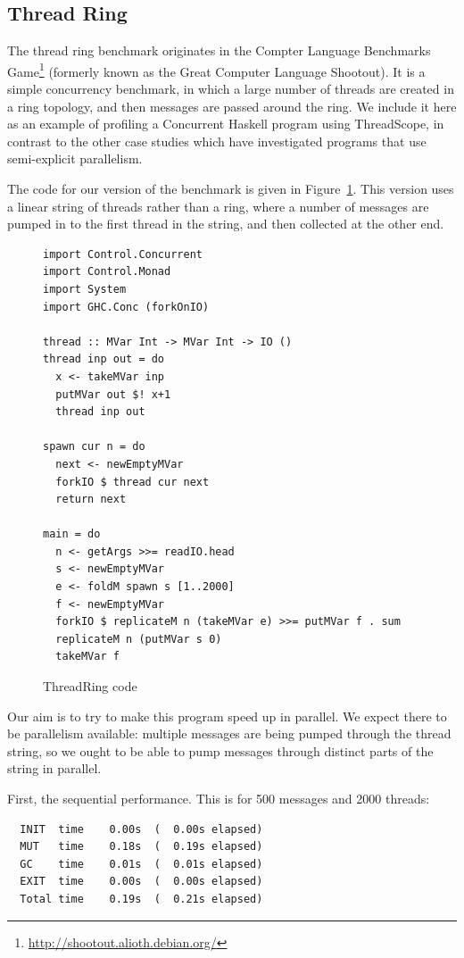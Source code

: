 \subsection{Thread Ring}

The thread ring benchmark originates in the Compter Language
Benchmarks Game\footnote{\url{http://shootout.alioth.debian.org/}}
(formerly known as the Great Computer Language Shootout).  It is a
simple concurrency benchmark, in which a large number of threads are
created in a ring topology, and then messages are passed around the
ring.  We include it here as an example of profiling a Concurrent
Haskell program using ThreadScope, in contrast to the other case
studies which have investigated programs that use semi-explicit
parallelism.

The code for our version of the benchmark is given in
Figure~\ref{f:threadring-code}.  This version uses a linear string of
threads rather than a ring, where a number of messages are pumped in
to the first thread in the string, and then collected at the other
end.

\begin{figure}
\begin{lstlisting}
import Control.Concurrent
import Control.Monad
import System
import GHC.Conc (forkOnIO)

thread :: MVar Int -> MVar Int -> IO ()
thread inp out = do 
  x <- takeMVar inp
  putMVar out $! x+1
  thread inp out

spawn cur n = do 
  next <- newEmptyMVar
  forkIO $ thread cur next
  return next

main = do 
  n <- getArgs >>= readIO.head
  s <- newEmptyMVar
  e <- foldM spawn s [1..2000]
  f <- newEmptyMVar
  forkIO $ replicateM n (takeMVar e) >>= putMVar f . sum
  replicateM n (putMVar s 0)
  takeMVar f
\end{lstlisting}
\caption{ThreadRing code}
\label{f:threadring-code}
\end{figure}

Our aim is to try to make this program speed up in parallel.  We
expect there to be parallelism available: multiple messages are
being pumped through the thread string, so we ought to be able to pump
messages through distinct parts of the string in parallel.

First, the sequential performance.  This is for 500 messages and 2000 threads:

\begin{verbatim}
  INIT  time    0.00s  (  0.00s elapsed)
  MUT   time    0.18s  (  0.19s elapsed)
  GC    time    0.01s  (  0.01s elapsed)
  EXIT  time    0.00s  (  0.00s elapsed)
  Total time    0.19s  (  0.21s elapsed)
\end{verbatim}

